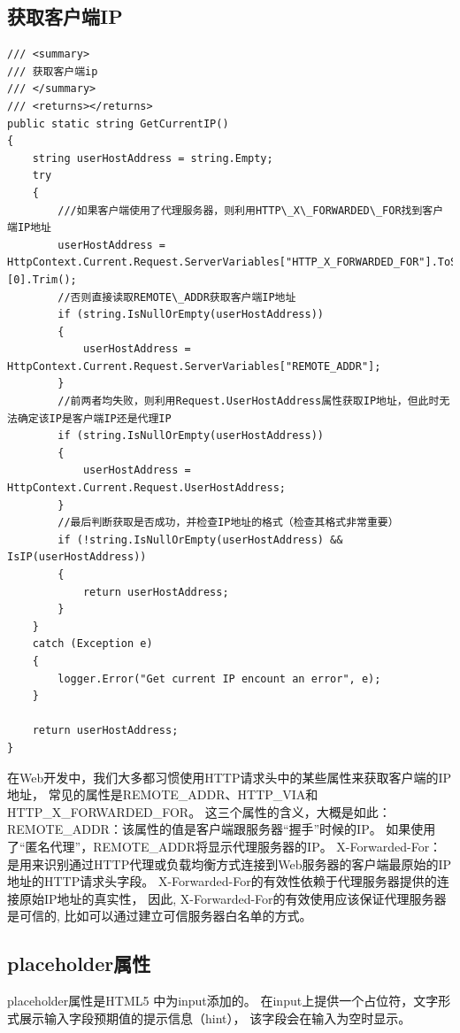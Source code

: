 \documentclass{book}
\begin{document}
\subsection{获取客户端IP}

\begin{lstlisting}[language={[Sharp]C}]
/// <summary>
/// 获取客户端ip
/// </summary>
/// <returns></returns>
public static string GetCurrentIP()
{
    string userHostAddress = string.Empty;
    try
    {
        ///如果客户端使用了代理服务器，则利用HTTP\_X\_FORWARDED\_FOR找到客户端IP地址
        userHostAddress = HttpContext.Current.Request.ServerVariables["HTTP_X_FORWARDED_FOR"].ToString().Split(',')[0].Trim();
        //否则直接读取REMOTE\_ADDR获取客户端IP地址
        if (string.IsNullOrEmpty(userHostAddress))
        {
            userHostAddress = HttpContext.Current.Request.ServerVariables["REMOTE_ADDR"];
        }
        //前两者均失败，则利用Request.UserHostAddress属性获取IP地址，但此时无法确定该IP是客户端IP还是代理IP
        if (string.IsNullOrEmpty(userHostAddress))
        {
            userHostAddress = HttpContext.Current.Request.UserHostAddress;
        }
        //最后判断获取是否成功，并检查IP地址的格式（检查其格式非常重要）
        if (!string.IsNullOrEmpty(userHostAddress) && IsIP(userHostAddress))
        {
            return userHostAddress;
        }
    }
    catch (Exception e)
    {
        logger.Error("Get current IP encount an error", e);
    }

    return userHostAddress;
}
\end{lstlisting}

在Web开发中，我们大多都习惯使用HTTP请求头中的某些属性来获取客户端的IP地址，
常见的属性是REMOTE\_ADDR、HTTP\_VIA和HTTP\_X\_FORWARDED\_FOR。
这三个属性的含义，大概是如此：REMOTE\_ADDR：该属性的值是客户端跟服务器“握手”时候的IP。
如果使用了“匿名代理”，REMOTE\_ADDR将显示代理服务器的IP。
X-Forwarded-For：
是用来识别通过HTTP代理或负载均衡方式连接到Web服务器的客户端最原始的IP地址的HTTP请求头字段。
X-Forwarded-For的有效性依赖于代理服务器提供的连接原始IP地址的真实性，
因此, X-Forwarded-For的有效使用应该保证代理服务器是可信的, 
比如可以通过建立可信服务器白名单的方式。

\subsection{placeholder属性}

placeholder属性是HTML5 中为input添加的。
在input上提供一个占位符，文字形式展示输入字段预期值的提示信息（hint），
该字段会在输入为空时显示。
\end{document}
